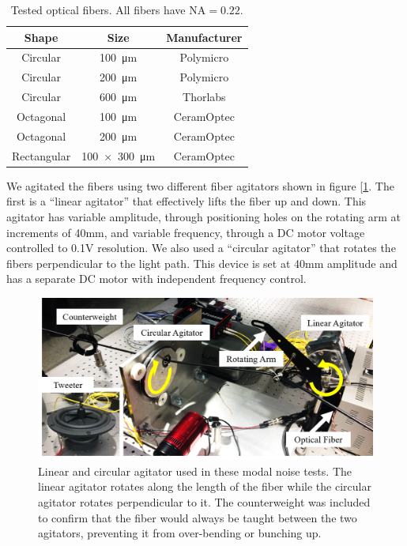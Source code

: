 \documentclass[twocolumn]{emulateapj}
\begin{document}
\begin{table}
\centering
\caption{Tested optical fibers. All fibers have $\textrm{NA} = 0.22$.}
	\begin{tabular}{ccc}
	\hline
	Shape & Size & Manufacturer \\
	\hline
	\hline
	Circular & \SI{100}{\micro\meter} & Polymicro \\
	Circular & \SI{200}{\micro\meter} & Polymicro \\
	Circular & \SI{600}{\micro\meter} & Thorlabs \\
	Octagonal & \SI{100}{\micro\meter} & CeramOptec \\
	Octagonal & \SI{200}{\micro\meter} & CeramOptec \\
	Rectangular & \SI{100x300}{\micro\meter} & CeramOptec \\
	\hline
	\end{tabular}
\label{table:fibers}
\end{table}

We agitated the fibers using two different fiber agitators shown in figure [\ref{fig:agitators}. The first is a ``linear agitator'' that effectively lifts the fiber up and down. This agitator has variable amplitude, through positioning holes on the rotating arm at increments of 40mm, and variable frequency, through a DC motor voltage controlled to 0.1V resolution. We also used a ``circular agitator'' that rotates the fibers perpendicular to the light path. This device is set at 40mm amplitude and has a separate DC motor with independent frequency control.

\begin{figure}
\centering
	\includegraphics[width=\columnwidth]{images/agitators_labelled.png}
	\caption{Linear and circular agitator used in these modal noise tests. The linear agitator 	rotates along the length of the fiber while the circular agitator rotates perpendicular to it. The counterweight was included to confirm that the fiber would always be taught between the two agitators, preventing it from over-bending or bunching up.}
\label{fig:agitators}
\end{figure} 
\end{document}
